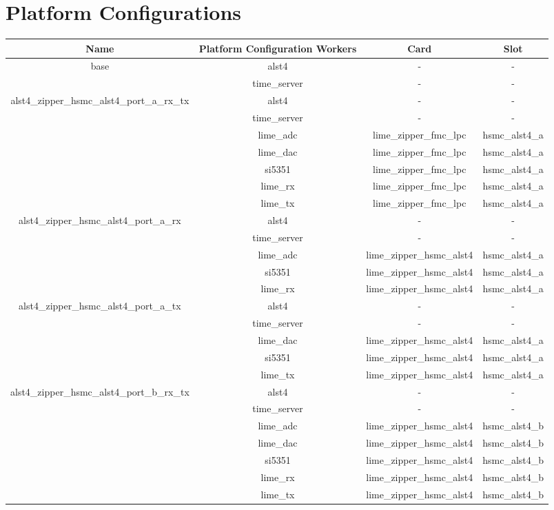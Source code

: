 \documentclass{article}
\def\comp{alst4}
\begin{document}
\section*{Platform Configurations}
	\begin{tabular}{|c|c|c|c|}
		\hline
		\rowcolor{blue}
		Name & Platform Configuration Workers & Card & Slot \\
		\hline
		\multirow{2}{*}{base} &\comp & - & - \\ &time\_server & - & - \\
		\hline
		\multirow{5}{*}{alst4\_zipper\_hsmc\_alst4\_port\_a\_rx\_tx} &\comp & - & - \\ &time\_server & - & - \\ &lime\_adc & lime\_zipper\_fmc\_lpc & hsmc\_alst4\_a \\ &lime\_dac & lime\_zipper\_fmc\_lpc & hsmc\_alst4\_a \\ &si5351 & lime\_zipper\_fmc\_lpc & hsmc\_alst4\_a \\ &lime\_rx & lime\_zipper\_fmc\_lpc & hsmc\_alst4\_a \\ &lime\_tx & lime\_zipper\_fmc\_lpc & hsmc\_alst4\_a \\
		\hline
		\multirow{5}{*}{alst4\_zipper\_hsmc\_alst4\_port\_a\_rx} &\comp & - & - \\ &time\_server & - & - \\ &lime\_adc & lime\_zipper\_hsmc\_alst4 & hsmc\_alst4\_a \\  &si5351 & lime\_zipper\_hsmc\_alst4 & hsmc\_alst4\_a \\ &lime\_rx & lime\_zipper\_hsmc\_alst4 & hsmc\_alst4\_a \\
		\hline
		\multirow{5}{*}{alst4\_zipper\_hsmc\_alst4\_port\_a\_tx} &\comp & - & - \\ &time\_server & - & - \\ &lime\_dac & lime\_zipper\_hsmc\_alst4 & hsmc\_alst4\_a \\  &si5351 & lime\_zipper\_hsmc\_alst4 & hsmc\_alst4\_a \\ &lime\_tx & lime\_zipper\_hsmc\_alst4 & hsmc\_alst4\_a \\
		\hline
		\multirow{5}{*}{alst4\_zipper\_hsmc\_alst4\_port\_b\_rx\_tx} &\comp & - & - \\ &time\_server & - & - \\ &lime\_adc & lime\_zipper\_hsmc\_alst4 & hsmc\_alst4\_b \\ &lime\_dac & lime\_zipper\_hsmc\_alst4 & hsmc\_alst4\_b \\ &si5351 & lime\_zipper\_hsmc\_alst4 & hsmc\_alst4\_b \\ &lime\_rx & lime\_zipper\_hsmc\_alst4 & hsmc\_alst4\_b \\ &lime\_tx & lime\_zipper\_hsmc\_alst4 & hsmc\_alst4\_b \\

\end{tabular}
\end{document}

